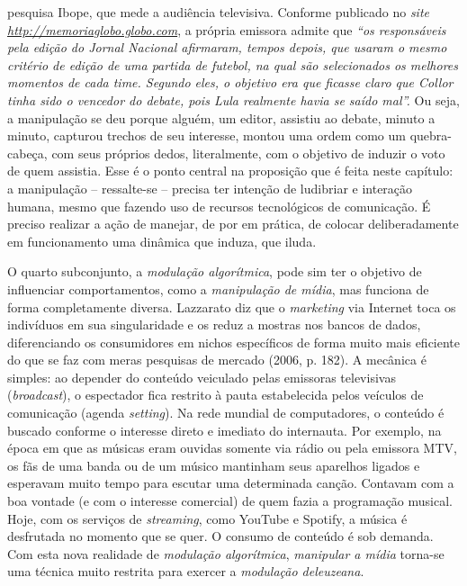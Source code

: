 pesquisa Ibope, que mede a audiência televisiva. Conforme publicado no
\emph{site}
\href{http://memoriaglobo.globo.com/}{\emph{http://memoriaglobo.globo.com}},
a própria emissora admite que \emph{``os responsáveis pela edição do
Jornal Nacional afirmaram, tempos depois, que usaram o mesmo critério de
edição de uma partida de futebol, na qual são selecionados os melhores
momentos de cada time. Segundo eles, o objetivo era que ficasse claro
que Collor tinha sido o vencedor do debate, pois Lula realmente havia se
saído mal''.} Ou seja, a manipulação se deu porque alguém, um editor,
assistiu ao debate, minuto a minuto, capturou trechos de seu interesse,
montou uma ordem como um quebra-cabeça, com seus próprios dedos,
literalmente, com o objetivo de induzir o voto de quem assistia. Esse é
o ponto central na proposição que é feita neste capítulo: a manipulação
-- ressalte-se -- precisa ter intenção de ludibriar e interação humana,
mesmo que fazendo uso de recursos tecnológicos de comunicação. É preciso
realizar a ação de manejar, de por em prática, de colocar
deliberadamente em funcionamento uma dinâmica que induza, que iluda.

O quarto subconjunto, a \emph{modulação algorítmica}, pode sim ter o
objetivo de influenciar comportamentos, como a \emph{manipulação de
mídia}, mas funciona de forma completamente diversa. Lazzarato diz que o
\emph{marketing} via Internet toca os indivíduos em sua singularidade e
os reduz a mostras nos bancos de dados, diferenciando os consumidores em
nichos específicos de forma muito mais eficiente do que se faz com meras
pesquisas de mercado (2006, p. 182). A mecânica é simples: ao depender
do conteúdo veiculado pelas emissoras televisivas (\emph{broadcast}), o
espectador fica restrito à pauta estabelecida pelos veículos de
comunicação (agenda \emph{setting}). Na rede mundial de computadores, o
conteúdo é buscado conforme o interesse direto e imediato do internauta.
Por exemplo, na época em que as músicas eram ouvidas somente via rádio
ou pela emissora MTV, os fãs de uma banda ou de um músico mantinham seus
aparelhos ligados e esperavam muito tempo para escutar uma determinada
canção. Contavam com a boa vontade (e com o interesse comercial) de quem
fazia a programação musical. Hoje, com os serviços de \emph{streaming},
como YouTube e Spotify, a música é desfrutada no momento que se quer. O
consumo de conteúdo é sob demanda. Com esta nova realidade de
\emph{modulação algorítmica}, \emph{manipular a mídia} torna-se uma
técnica muito restrita para exercer a \emph{modulação deleuzeana}.

